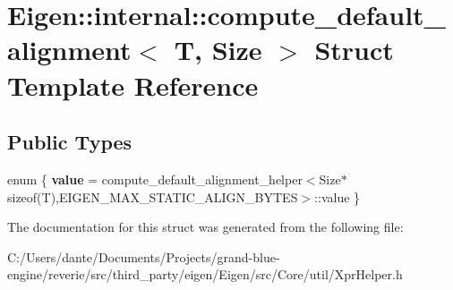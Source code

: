 \hypertarget{struct_eigen_1_1internal_1_1compute__default__alignment}{}\section{Eigen\+::internal\+::compute\+\_\+default\+\_\+alignment$<$ T, Size $>$ Struct Template Reference}
\label{struct_eigen_1_1internal_1_1compute__default__alignment}
\subsection*{Public Types}
\begin{DoxyCompactItemize}
\item 
\mbox{\label{struct_eigen_1_1internal_1_1compute__default__alignment_a23b2bc2863ec1941b9a30e4c473d0b09}} 
enum \{ {\bfseries value} = compute\+\_\+default\+\_\+alignment\+\_\+helper$<$Size$\ast$sizeof(T),E\+I\+G\+E\+N\+\_\+\+M\+A\+X\+\_\+\+S\+T\+A\+T\+I\+C\+\_\+\+A\+L\+I\+G\+N\+\_\+\+B\+Y\+T\+ES$>$\+::value
 \}
\end{DoxyCompactItemize}


The documentation for this struct was generated from the following file\+:\begin{DoxyCompactItemize}
\item 
C\+:/\+Users/dante/\+Documents/\+Projects/grand-\/blue-\/engine/reverie/src/third\+\_\+party/eigen/\+Eigen/src/\+Core/util/Xpr\+Helper.\+h\end{DoxyCompactItemize}
